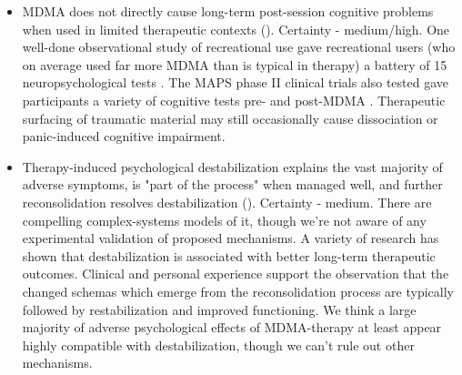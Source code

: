 \documentclass[12pt,letterpaper]{book}
\begin{document}
\begin{itemize}
	\item MDMA does not directly cause long-term post-session cognitive problems when used in limited therapeutic contexts (\textcite{wolfgang2025,passieHistory}). Certainty - medium/high. One well-done observational study of recreational use gave recreational users (who on average used far more MDMA than is typical in therapy) a battery of 15 neuropsychological tests \cite{halpernMormonRavers}. The MAPS phase II clinical trials also tested gave participants a variety of cognitive tests pre- and post-MDMA \cite{mithoefer2019mdma}. Therapeutic surfacing of traumatic material may still occasionally cause dissociation or panic-induced cognitive impairment.
	\item Therapy-induced psychological destabilization explains the vast majority of adverse symptoms, is "part of the process" when managed well, and further reconsolidation resolves destabilization (\textcite{olthofDestabilization}). Certainty - medium. There are compelling complex-systems models of it, though we're not aware of any experimental validation of proposed mechanisms. A variety of research has shown that destabilization is associated with better long-term therapeutic outcomes. Clinical and personal experience support the observation that the changed schemas which emerge from the reconsolidation process are typically followed by restabilization and improved functioning. We think a large majority of adverse psychological effects of MDMA-therapy at least appear highly compatible with destabilization, though we can't rule out other mechanisms.
\end{itemize}
\end{document}

